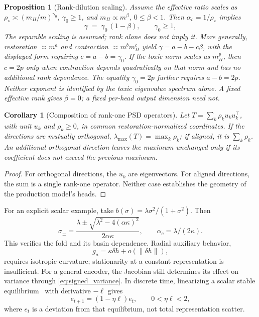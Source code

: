 \documentclass{article}
\newtheorem{proposition}{Proposition}
\newtheorem{corollary}{Corollary}
\begin{document}
\begin{proposition}[Rank-dilution scaling]\label{prop:rank_dilution}
Assume the effective ratio scales as $\rho_\star\asymp(m_\Pi/m)^{\gamma_0}$, $\gamma_0\ge1$, and $m_\Pi\propto m^\beta$, $0\le\beta<1$. Then $\alpha_c=1/\rho_\star$ implies
\begin{equation}
\gamma \;=\; \gamma_0\,(1-\beta), \qquad \gamma_0 \ge 1,
\label{eq:rank_dilution}
\end{equation}
The separable scaling is assumed; rank alone does not imply it. More generally, restoration $\asymp m^a$ and contraction $\asymp m^b m_\Pi^c$ yield $\gamma=a-b-c\beta$, with the displayed form requiring $c=a-b=\gamma_0$. If the toxic norm scales as $m_\Pi^p$, then $c=2p$ only when contraction depends quadratically on that norm and has no additional rank dependence. The equality $\gamma_0=2p$ further requires $a-b=2p$. Neither exponent is identified by the toxic eigenvalue spectrum alone. A fixed effective rank gives $\beta=0$; a fixed per-head output dimension need not.
\end{proposition}

\begin{corollary}[Composition of rank-one PSD operators]\label{cor:additive}
Let $T=\sum_k\rho_k u_ku_k^\top$, with unit $u_k$ and $\rho_k\ge0$, in common restoration-normalized coordinates. If the directions are mutually orthogonal, $\lambda_{\max}(T)=\max_k\rho_k$; if aligned, it is $\sum_k\rho_k$. An additional orthogonal direction leaves the maximum unchanged only if its coefficient does not exceed the previous maximum.
\end{corollary}
\begin{proof}
For orthogonal directions, the $u_k$ are eigenvectors. For aligned directions, the sum is a single rank-one operator. Neither case establishes the geometry of the production model's heads.
\end{proof}

For an explicit scalar example, take $b(\sigma)=\lambda\sigma^2/(1+\sigma^2)$. Then
\begin{equation}
\sigma_\pm=\frac{\lambda\pm\sqrt{\lambda^2-4(\alpha\kappa)^2}}{2\alpha\kappa},\qquad \alpha_c=\lambda/(2\kappa).
\label{eq:fp}
\end{equation}
This verifies the fold and its basin dependence. Radial auxiliary behavior,
\begin{equation}
g_a=\kappa\delta h+o(\|\delta h\|),
\label{eq:radial}
\end{equation}
requires isotropic curvature; stationarity at a constant representation is insufficient. For a general encoder, the Jacobian still determines its effect on variance through \eqref{eq:signed_variance}. In discrete time, linearizing a scalar stable equilibrium~\citep{strogatz1994nonlinear} with derivative $-\ell$ gives
\begin{equation}
e_{t+1}=(1-\eta\ell)e_t,\qquad 0<\eta\ell<2,
\label{eq:parallel_contraction}
\end{equation}
where $e_t$ is a deviation from that equilibrium, not total representation scatter.
\end{document}
